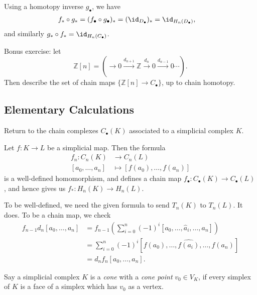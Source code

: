 \documentclass[12pt]{article}
\begin{document}
\begin{proofbox}
	Using a homotopy inverse $g_\bullet$, we have
	\begin{align*}
		f_\ast \circ g_\ast &= (f_\bullet \circ g_\bullet)_\ast = (\id_{D_\bullet})_\ast = \id_{H_n(D_\bullet)},
	\end{align*}
	and similarly $g_\ast \circ f_\ast = \id_{H_n(C_\bullet)}$.
\end{proofbox}

Bonus exercise: let
\[
	\mathbb{Z}[n] = (\to 0 \overset{d_{n+1}} \to \mathbb{Z} \overset{d_n} \to 0 \overset{d_{n-1}} \to 0 \cdots).
\]
Then describe the set of chain maps $\{\mathbb{Z}[n] \to C_\bullet\}$, up to chain homotopy.

\subsection{Elementary Calculations}
\label{sub:el_cal}

Return to the chain complexes $C_\bullet(K)$ associated to a simplicial complex $K$.

\begin{lemma}
	Let $f : K \to L$ be a simplicial map. Then the formula
	\begin{align*}
		f_n : C_n(K) &\to C_n(L) \\
		[a_0, \ldots, a_n] &\mapsto [f(a_0), \ldots, f(a_n)]
	\end{align*}
	is a well-defined homomorphism, and defines a chain map $f_\bullet : C_\bullet(K) \to C_\bullet(L)$, and hence gives us $f_\ast : H_n(K) \to H_n(L)$.
\end{lemma}

\begin{proofbox}
	To be well-defined, we need the given formula to send $T_n(K)$ to $T_n(L)$. It does. To be a chain map, we check
	\begin{align*}
		f_{n-1}d_n [a_0, \ldots, a_n] &= f_{n-1} \left( \sum_{i = 0}^n (-1)^i [a_0, \ldots, \hat a_i, \ldots, a_n] \right) \\
					      &= \sum_{i = 0}^n (-1)^i [f(a_0), \ldots, \hat{f(a_i)}, \ldots, f(a_n)] \\
					      &= d_n f_n[a_0, \ldots, a_n].
	\end{align*}
\end{proofbox}

\begin{definition}
	Say a simplicial complex $K$ is a \emph{cone} with a \emph{cone point}  $v_0 \in V_K$, if every simplex of $K$ is a face of a simplex which has $v_0$ as a vertex.
\end{definition}
\end{document}

